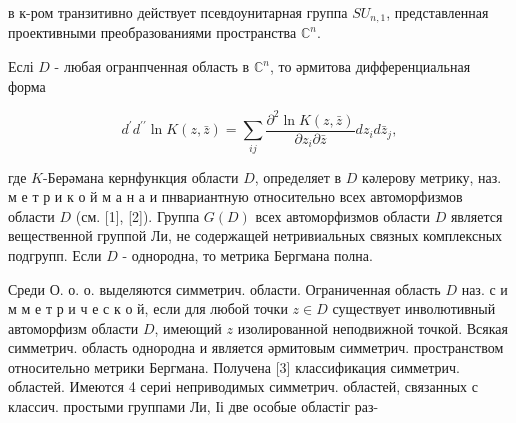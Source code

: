 \documentclass[10pt]{article}
\begin{document}
в к-ром транзитивно действует псевдоунитарная группа $S U_{n, 1}$, представленная проективными преобразованиями пространства $\mathbb{C}^{n}$.



Еслі $D$ - любая огранпченная область в $\mathbb{C}^{n}$, то әрмитова дифференциальная форма



\[

d^{\prime} d^{\prime \prime} \ln K(z, \bar{z})=\sum_{i j} \frac{\partial^{2} \ln K(z, \bar{z})}{\partial z_{i} \partial \bar{z}} d z_{i} d \bar{z}_{j},

\]



где $K$-Берәмана кернфункция области $D$, определяет в $D$ кәлерову метрику, наз. м е т р и к о й м а н а и пнвариантную относительно всех автоморфизмов области $D$ (см. [1], [2]). Группа $G(D)$ всех автоморфизмов области $D$ является вещественной группой Ли, не содержащей нетривиальных связных комплексных подгрупп. Если $D$ - однородна, то метрика Бергмана полна.



Среди О. о. о. выделяются симметрич. области. Ограниченная область $D$ наз. с и м м е т р и ч е с к о й, если для любой точки $z \in D$ существует инволютивный автоморфизм области $D$, имеющий $z$ изолированной неподвижной точкой. Всякая симметрич. область однородна и является әрмитовым симметрич. пространством относительно метрики Бергмана. Получена [3] классификация симметрич. областей. Имеются 4 сериі неприводимых симметрич. областей, связанных с классич. простыми группами Ли, Іі две особые областіг раз-
\end{document}
